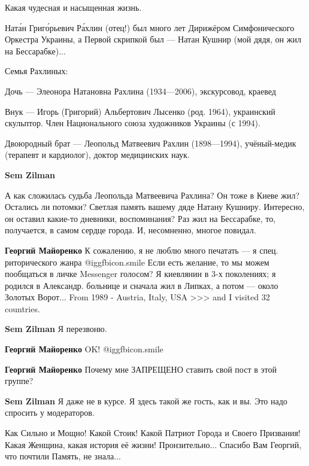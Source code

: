 \begin{itemize}
Какая чудесная и насыщенная жизнь.


Ната́н Григо́рьевич Ра́хлин (отец!) был много лет Дирижёром Симфонического
Оркестра Украины, а Первой скрипкой был — Натан Кушнир (мой дядя, он жил на
Бессарабке)...

Семья Рахлиных:

Дочь — Элеонора Натановна Рахлина (1934—2006), экскурсовод, краевед

Внук — Игорь (Григорий) Альбертович Лысенко (род. 1964), украинский скульптор.
Член Национального союза художников Украины (с 1994).

Двоюродный брат — Леопольд Матвеевич Рахлин (1898—1994), учёный-медик (терапевт
и кардиолог), доктор медицинских наук.

\begin{itemize} %
\textbf{Sem Zilman} 

А как сложилась судьба Леопольда Матвеевича Рахлина? Он тоже в Киеве жил?
Остались ли потомки? Светлая память вашему дяде Натану Кушниру. Интересно, он
оставил какие-то дневники, воспоминания? Раз жил на Бессарабке, то, получается,
в самом сердце города. И, несомненно, многое повидал.

\begin{itemize} %
\textbf{Георгий Майоренко} К сожалению, я не люблю много печатать — я спец. риторического жанра  @igg{fbicon.smile} 
Если есть желание, то мы можем пообщаться в личке Messenger голосом?
Я киевлянин в 3-х поколениях; я родился в Александр. больнице и сначала жил в Липках, а потом — около Золотых Ворот... From 1989 - Austria, Italy, USA >>> and I visited 32 countries.

\textbf{Sem Zilman} Я перезвоню.

\textbf{Георгий Майоренко} OK!  @igg{fbicon.smile} 

\textbf{Георгий Майоренко} Почему мне ЗАПРЕЩЕНО ставить свой пост в этой группе?

\textbf{Sem Zilman} Я даже не в курсе. Я здесь такой же гость, как и вы. Это надо спросить у модераторов.
\end{itemize} %

\end{itemize} %


Как Сильно и Мощно! Какой Стоик! Какой Патриот Города и Своего Призвания! Какая
Женщина, какая история её жизни! Пронзительно... Спасибо Вам Георгий, что
почтили Память, не знала...


\end{itemize}

